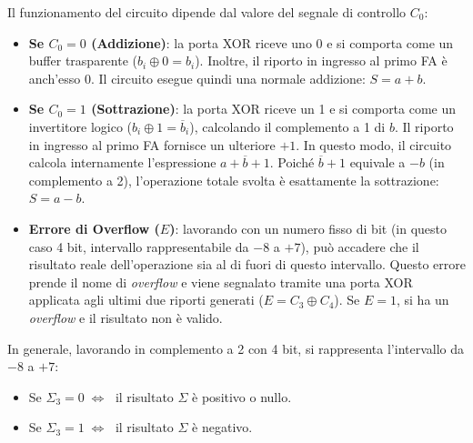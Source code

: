 \documentclass[11pt,a4paper]{report}
\begin{document}
Il funzionamento del circuito dipende dal valore del segnale di controllo $C_0$:

\begin{itemize}[leftmargin=1.5em]
    \item \textbf{Se $C_0=0$ (Addizione)}: la porta XOR riceve uno 0 e si comporta come un buffer trasparente ($b_i \oplus 0 = b_i$). Inoltre, il riporto in ingresso al primo FA è anch'esso 0. Il circuito esegue quindi una normale addizione: $S = a + b$.
    
    \item \textbf{Se $C_0=1$ (Sottrazione)}: la porta XOR riceve un 1 e si comporta come un invertitore logico ($b_i \oplus 1 = \overline{b}_i$), calcolando il complemento a 1 di $b$. Il riporto in ingresso al primo FA fornisce un ulteriore $+1$. In questo modo, il circuito calcola internamente l'espressione $a + \overline{b} + 1$. Poiché $\overline{b} + 1$ equivale a $-b$ (in complemento a 2), l'operazione totale svolta è esattamente la sottrazione: $S = a - b$.
    
    \item \textbf{Errore di Overflow ($E$)}: lavorando con un numero fisso di bit (in questo caso 4 bit, intervallo rappresentabile da $-8$ a $+7$), può accadere che il risultato reale dell'operazione sia al di fuori di questo intervallo. Questo errore prende il nome di \emph{overflow} e viene segnalato tramite una porta XOR applicata agli ultimi due riporti generati ($E = C_3 \oplus C_4$). Se $E=1$, si ha un \emph{overflow} e il risultato non è valido.
\end{itemize}

In generale, lavorando in complemento a 2 con 4 bit, si rappresenta l'intervallo da $-8$ a $+7$:
\begin{itemize}[leftmargin=1.5em]
    \item[\small$\blacksquare$] Se $\Sigma_3 = 0 \;\Leftrightarrow\;$ il risultato $\Sigma$ è positivo o nullo.
    \item[\small$\blacksquare$] Se $\Sigma_3 = 1 \;\Leftrightarrow\;$ il risultato $\Sigma$ è negativo.
\end{itemize}

\begin{center}
\end{center}
\end{document}
